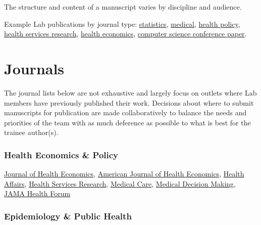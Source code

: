 \documentclass[
]{book}
\begin{document}
The structure and content of a manuscript varies by discipline and audience.

Example Lab publications by journal type: \href{https://onlinelibrary.wiley.com/doi/10.1111/biom.13863}{statistics}, \href{https://jamanetwork.com/journals/jamapsychiatry/fullarticle/2765490?guestAccessKey=8e0d777c-ac53-47e9-9387-722b788058a2\&utm_campaign=author_alert-jamanetwork\&utm_content=author-author_engagement\&utm_medium=email\&utm_source=jps\&utm_term=1m}{medical}, \href{https://www.healthaffairs.org/doi/full/10.1377/hlthaff.2015.1026}{health policy}, \href{https://onlinelibrary.wiley.com/doi/10.1111/1475-6773.13046}{health services research}, \href{https://www.journals.uchicago.edu/doi/10.1086/716199}{health economics}, \href{https://proceedings.mlr.press/v180/chapfuwa22a.html}{computer science conference paper}.

\hypertarget{journals}{%
\section{Journals}\label{journals}}

The journal lists below are not exhaustive and largely focus on outlets where Lab members have previously published their work. Decisions about where to submit manuscripts for publication are made collaboratively to balance the needs and priorities of the team with as much deference as possible to what is best for the trainee author(s).

\hypertarget{health-economics-policy}{%
\subsubsection*{Health Economics \& Policy}\label{health-economics-policy}}

\href{https://www.journals.elsevier.com/journal-of-health-economics}{Journal of Health Economics}, \href{https://www.journals.uchicago.edu/toc/ajhe/current}{American Journal of Health Economics}, \href{https://www.healthaffairs.org/}{Health Affairs}, \href{https://www.hsr.org/}{Health Services Research}, \href{https://journals.lww.com/lww-medicalcare/pages/default.aspx}{Medical Care}, \href{https://journals.sagepub.com/home/mdm}{Medical Decision Making}, \href{https://jamanetwork.com/journals/jama-health-forum}{JAMA Health Forum}

\hypertarget{epidemiology-public-health}{%
\subsubsection*{Epidemiology \& Public Health}\label{epidemiology-public-health}}
\end{document}
